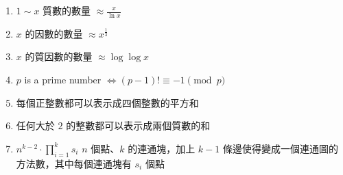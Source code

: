 \begin{enumerate}
    \item $1 \sim x$ 質數的數量 $\approx \frac{x}{\ln x}$
    \item $x$ 的因數的數量 $\approx x^\frac{1}{3}$
    \item $x$ 的質因數的數量 $\approx \log{\log{x}}$
    \item $p$ is a prime number $\Leftrightarrow (p-1)! \equiv -1  \pmod{p}$
    \item 每個正整數都可以表示成四個整數的平方和
    \item 任何大於 $2$ 的整數都可以表示成兩個質數的和
    \item $n^{k-2} \cdot \prod_{i=1}^{k} s_i$ $n$ 個點、$k$ 的連通塊，加上 $k-1$ 條邊使得變成一個連通圖的方法數，其中每個連通塊有 $s_i$ 個點
\end{enumerate}

